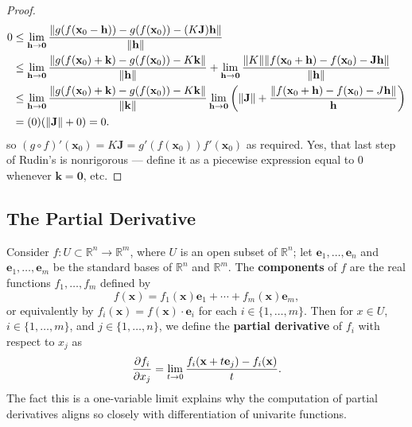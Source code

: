 \documentclass[11pt]{article}
\renewcommand{\vec}[1]{\mathbf{#1}}
\newcommand{\mat}[1]{\mathbf{#1}}
\begin{document}
\begin{adjustwidth}{0.5cm}{}
\begin{proof}
		\begin{align*}
			0 &\le \lim\limits_{\vec{h} \to \vec{0}} \frac{\norm{g(f(\vec{x}_{0} - \vec{h})) - g(f(\vec{x}_{0})) - (K\mat{J}) \vec{h}}}{\norm{\vec{h}}} \\
			&\le \lim\limits_{\vec{h} \to \vec{0}} \frac{\norm{g(f(\vec{x}_{0}) + \vec{k}) - g(f(\vec{x}_{0})) - K \vec{k}}}{\norm{\vec{h}}} + \lim\limits_{\vec{h} \to \vec{0}} \frac{\norm{K}\norm{f(\vec{x}_{0} + \vec{h}) - f(\vec{x}_{0}) - \mat{J} \vec{h}}}{\norm{\vec{h}}} \\
			&\le \lim\limits_{\vec{h} \to \vec{0}} \frac{\norm{g(f(\vec{x}_{0}) + \vec{k}) - g(f(\vec{x}_{0})) - K \vec{k}}}{\norm{\vec{k}}} \lim\limits_{\vec{h} \to \vec{0}} \left( \norm{\mat{J}} + \frac{\norm{f(\vec{x}_{0} + \vec{h}) - f(\vec{x}_{0}) - J \vec{h}}}{\vec{h}}\right) \\
			&= (0)(\norm{\mat{J}} + 0) = 0.	
		\end{align*}
		so $(g \circ f)'(\vec{x}_{0}) = K\mat{J} = g'(f(\vec{x}_{0})) f'(\vec{x}_{0})$ as required. Yes, that last step of Rudin's is nonrigorous --- define it as a piecewise expression equal to $0$ whenever $\vec{k} = \vec{0}$, etc.
	\end{proof}
\end{adjustwidth}


\subsection{The Partial Derivative}

Consider $f : U \subset \mathbb{R}^{n} \to \mathbb{R}^{m}$, where $U$ is an open subset of $\mathbb{R}^{n}$; let $\vec{e}_{1}, \ldots, \vec{e}_{n}$ and $\vec{e}_{1}, \ldots, \vec{e}_{m}$ be the standard bases of $\mathbb{R}^{n}$ and $\mathbb{R}^{m}$. The \textbf{components} of $f$ are the real functions $f_{1}, \ldots, f_{m}$ defined by
\[
	f(\vec{x}) = f_{1}(\vec{x}) \vec{e}_{1} + \cdots + f_{m}(\vec{x}) \vec{e}_{m},
\]
or equivalently by $f_{i}(\vec{x}) = f(\vec{x}) \cdot \vec{e}_{i}$ for each $i \in \{ 1, \ldots, m \}$. Then for $x \in U$, $i \in \{ 1, \ldots, m \}$, and $j \in \{ 1, \ldots, n \}$, we define the \textbf{partial derivative} of $f_{i}$ with respect to $x_{j}$ as
\[
	\pdv{f_{i}}{x_{j}} = \lim\limits_{t \to 0} \frac{f_{i}(\vec{x} + t \vec{e}_{j}) - f_{i}(\vec{x})}{t}.
\]
The fact this is a one-variable limit explains why the computation of partial derivatives aligns so closely with differentiation of univarite functions.
\end{document}
